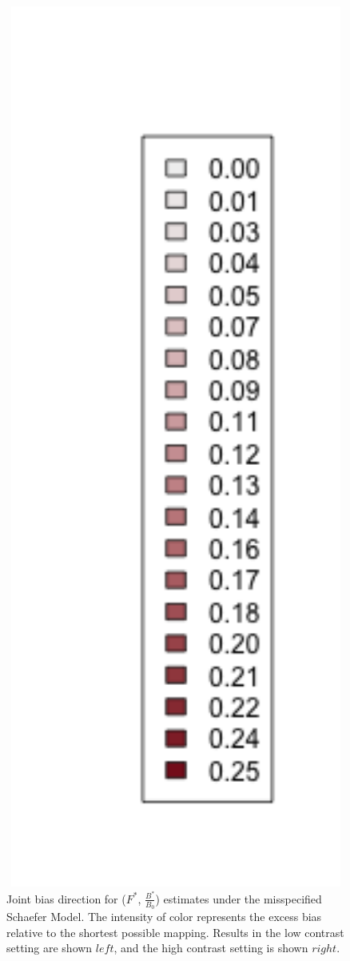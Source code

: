 \documentclass[12pt]{article}
\begin{document}
\begin{figure}[h!]
\begin{minipage}[h!]{0.44\textwidth}
\end{minipage}
\begin{minipage}[h!]{0.09\textwidth}
\hspace{-1cm}
\includegraphics[width=1.5\textwidth]{../ptNew/subLegnd.png}
\end{minipage}
\caption{
Joint bias direction for ($F^*$, $\frac{B^*}{B_0}$) estimates under 
the misspecified Schaefer Model. The intensity of color represents the excess 
bias relative to the shortest possible mapping. Results in the low contrast setting 
are shown $left$, and the high contrast setting is shown $right$.
}
\label{arrowsPT}
\end{figure}
\end{document}
